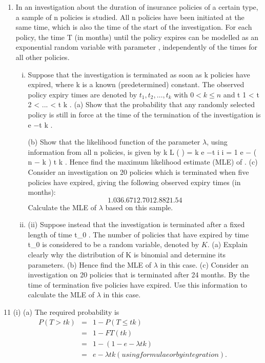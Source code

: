 \documentclass[a4paper,12pt]{article}
\begin{document}
\begin{enumerate}
\item In an investigation about the duration of insurance policies of a certain type, a sample of n policies is studied. All n policies have been initiated at the same time, which is also the time of the start of the investigation. For each policy, the time T (in months)
until the policy expires can be modelled as an exponential random variable with parameter \lambda , independently of the times for all other policies.
\begin{enumerate}[(i)]
\item %
Suppose that the investigation is terminated as soon as k policies have expired, where k is a known (predetermined) constant. The observed policy expiry times are denoted by $t_1 , t_2 , \ldots, t_k$ with $0 < k \leq n$ and t 1 < t 2 < ... < t k .
(a) Show that the probability that any randomly selected policy is still in force at the time of the termination of the investigation is e −\lambda  t k .

(b) Show that the likelihood function of the parameter $\lambda$, using information from all n policies, is given by
k
L ( \lambda  ) = \lambda  k e
−\lambda  \sum  t i
i = 1
e − ( n − k ) \lambda  t k .
Hence find the maximum likelihood estimate (MLE) of \lambda .
(c)
Consider an investigation on 20 policies which is terminated when five policies have expired, giving the following observed expiry times (in
months):
\[1.03 6.67 12.70 12.88 21.54\]
Calculate the MLE of $\lambda$ based on this sample.

\item (ii)
Suppose instead that the investigation is terminated after a fixed length of time t_{0}  . The number of policies that have expired by time t_{0}  is considered to be a random variable, denoted by $K$.
(a) Explain clearly why the distribution of K is binomial and determine its parameters.
(b) Hence find the MLE of $\lambda$ in this case.
(c) Consider an investigation on 20 policies that is terminated after 24 months. By the time of termination five policies have expired.
Use this information to calculate the MLE of $\lambda$ in this case.

\end{enumerate}
\end{enumerate}
\newpage
11
(i)
(a)
The required probability is
\begin{eqnarray*}
P ( T > t k ) &=& 1 − P ( T ≤ t k ) \\
&=& 1 − F T ( t k )\\
&=& 1 − (1 − e −\lambda  t k ) \\
&=& e − \lambda  t k (using formulae or by integration).\\
\end{eqnarray*}
\end{document}
